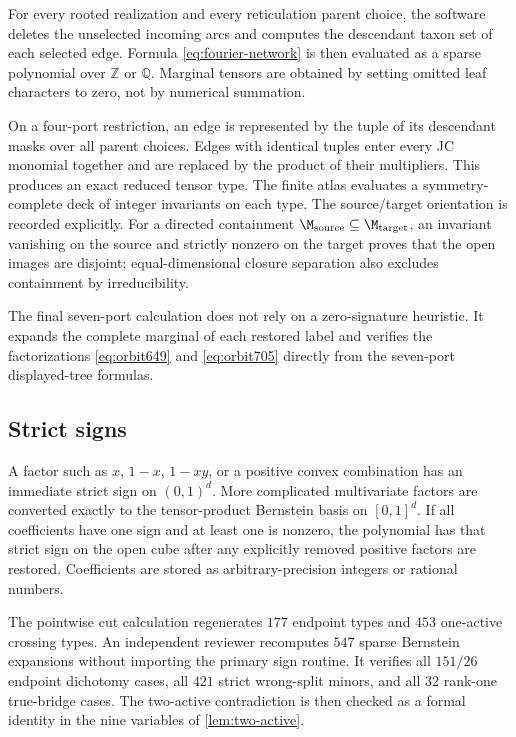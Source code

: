 For every rooted realization and every reticulation parent choice, the software deletes the unselected incoming arcs and computes the descendant taxon set of each selected edge.  Formula \eqref{eq:fourier-network} is then evaluated as a sparse polynomial over $\mathbb Z$ or $\mathbb Q$.  Marginal tensors are obtained by setting omitted leaf characters to zero, not by numerical summation.

On a four-port restriction, an edge is represented by the tuple of its descendant masks over all parent choices.  Edges with identical tuples enter every JC monomial together and are replaced by the product of their multipliers.  This produces an exact reduced tensor type.  The finite atlas evaluates a symmetry-complete deck of integer invariants on each type.  The source/target orientation is recorded explicitly.  For a directed containment $\M_{\rm source}\subseteq\M_{\rm target}$, an invariant vanishing on the source and strictly nonzero on the target proves that the open images are disjoint; equal-dimensional closure separation also excludes containment by irreducibility.

The final seven-port calculation does not rely on a zero-signature heuristic.  It expands the complete marginal of each restored label and verifies the factorizations \eqref{eq:orbit649} and \eqref{eq:orbit705} directly from the seven-port displayed-tree formulas.

\subsection{Strict signs}

A factor such as $x$, $1-x$, $1-xy$, or a positive convex combination has an immediate strict sign on $(0,1)^d$.  More complicated multivariate factors are converted exactly to the tensor-product Bernstein basis on $[0,1]^d$.  If all coefficients have one sign and at least one is nonzero, the polynomial has that strict sign on the open cube after any explicitly removed positive factors are restored.  Coefficients are stored as arbitrary-precision integers or rational numbers.

The pointwise cut calculation regenerates $177$ endpoint types and $453$ one-active crossing types.  An independent reviewer recomputes $547$ sparse Bernstein expansions without importing the primary sign routine.  It verifies all $151/26$ endpoint dichotomy cases, all $421$ strict wrong-split minors, and all $32$ rank-one true-bridge cases.  The two-active contradiction is then checked as a formal identity in the nine variables of \cref{lem:two-active}.

